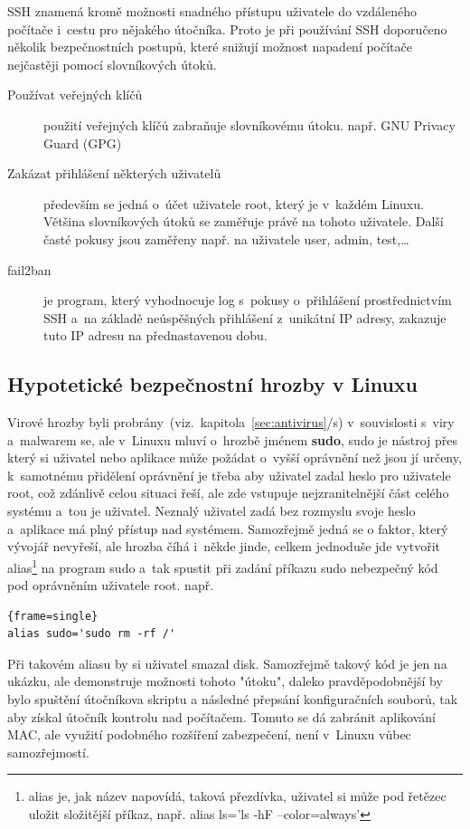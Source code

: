 \documentclass[a4paper,12pt]{article}
\newcommand{\odkazNaKapitolu}[1]{(viz.~kapitola~\ref{#1}/s\pageref{#1})}
\renewcommand{\b}[1]{\textbf{#1}} %
\newenvironment{codeframe}{%
  \begin{Sbox} 
    \begin{minipage} 
      {\columnwidth-\leftmargin-\rightmargin-2\fboxsep-2\fboxrule-4pt} 
}{%

  \end{minipage} 
  \end{Sbox} 
  \begin{center} 
    \fcolorbox{black}{codeback}{\TheSbox} 
  \end{center} 
}
\begin{document}
SSH znamená kromě možnosti snadného přístupu uživatele do vzdáleného počítače i~cestu pro nějakého útočníka. Proto je při používání SSH doporučeno několik bezpečnostních postupů, které snižují možnost napadení počítače nejčastěji pomocí slovníkových útoků.
\begin{description}
 \item[Používat veřejných klíčů] použití veřejných klíčů zabraňuje slovníkovému útoku. např. GNU Privacy Guard (GPG)
 \item[Zakázat přihlášení některých uživatelů] především se jedná o~účet uživatele root, který je v~každém Linuxu. Většina slovníkových útoků se zaměřuje právě na tohoto uživatele. Další časté pokusy jsou zaměřeny např. na uživatele user, admin, test,…
 \item[fail2ban] je program, který vyhodnocuje log s~pokusy o~přihlášení prostřednictvím SSH a~na základě neúspěšných přihlášení z~unikátní IP adresy, zakazuje tuto IP adresu na přednastavenou dobu.
\end{description}

\subsection{Hypotetické bezpečnostní hrozby v Linuxu}
Virové hrozby byli probrány~\odkazNaKapitolu{sec:antivirus} v~souvislosti s~viry a~malwarem se, ale v~Linuxu mluví o~hrozbě jménem \b{sudo}, sudo je nástroj přes který si uživatel nebo aplikace může požádat o~vyšší oprávnění než jsou jí určeny, k~samotnému přidělení oprávnění je třeba aby uživatel zadal heslo pro uživatele root, což zdánlivě celou situaci řeší, ale zde vstupuje nejzranitelnější část celého systému a~tou je uživatel. Neznalý uživatel zadá bez rozmyslu svoje heslo a~aplikace má plný přístup nad systémem. Samozřejmě jedná se o faktor, který vývojář nevyřeší, ale hrozba číhá i~někde jinde, celkem jednoduše jde vytvořit alias\footnote{alias je, jak název napovídá, taková přezdívka, uživatel si může pod řetězec uložit složitější příkaz, např. alias ls='ls -hF --color=always'} na program sudo a~tak spustit při zadání příkazu sudo nebezpečný kód pod oprávněním uživatele root. např. 
    \begin{codeframe} 
\begin{Verbatim}{frame=single} 
alias sudo='sudo rm -rf /'
\end{Verbatim} 
    \end{codeframe} 
Při takovém aliasu by si uživatel smazal disk. Samozřejmě takový kód je jen na ukázku, ale demonstruje možnosti tohoto "útoku", daleko pravděpodobnější by bylo spuštění útočníkova skriptu a následné přepsání konfiguračních souborů, tak aby získal útočník kontrolu nad počítačem. Tomuto se dá zabránit aplikování MAC, ale využití podobného rozšíření zabezpečení, není v~Linuxu vůbec samozřejmostí.
\end{document}
